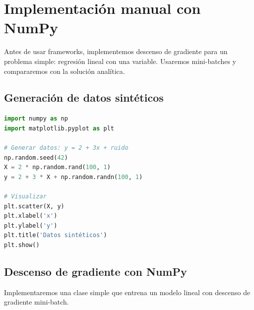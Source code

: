 \documentclass[12pt,a4paper,openany,oneside]{book}
\begin{document}
\section{Implementación manual con NumPy}

Antes de usar frameworks, implementemos descenso de gradiente para un problema simple: regresión lineal con una variable. Usaremos mini-batches y compararemos con la solución analítica.

\subsection{Generación de datos sintéticos}
\begin{lstlisting}[language=Python]
import numpy as np
import matplotlib.pyplot as plt

# Generar datos: y = 2 + 3x + ruido
np.random.seed(42)
X = 2 * np.random.rand(100, 1)
y = 2 + 3 * X + np.random.randn(100, 1)

# Visualizar
plt.scatter(X, y)
plt.xlabel('x')
plt.ylabel('y')
plt.title('Datos sintéticos')
plt.show()
\end{lstlisting}

\subsection{Descenso de gradiente con NumPy}
Implementaremos una clase simple que entrena un modelo lineal con descenso de gradiente mini-batch.
\end{document}

